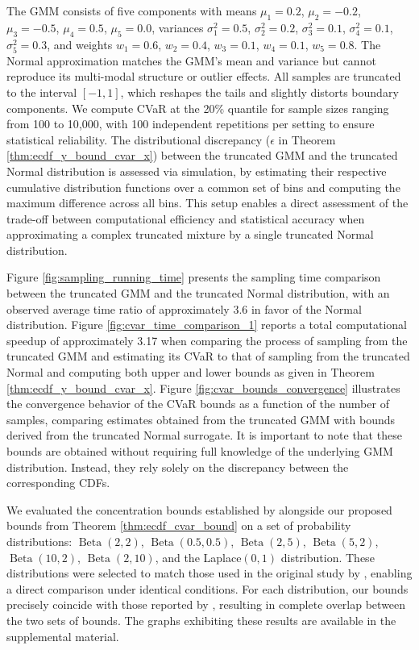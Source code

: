 \documentclass[letterpaper]{article} %
\begin{document}
The GMM consists of five components with means $\mu_1 = 0.2$, $\mu_2 = -0.2$, $\mu_3 = -0.5$, $\mu_4 = 0.5$, $\mu_5 = 0.0$, variances $\sigma_1^2 = 0.5$, $\sigma_2^2 = 0.2$, $\sigma_3^2 = 0.1$, $\sigma_4^2 = 0.1$, $\sigma_5^2 = 0.3$, and weights $w_1 = 0.6$, $w_2 = 0.4$, $w_3 = 0.1$, $w_4 = 0.1$, $w_5 = 0.8$. The Normal approximation matches the GMM's mean and variance but cannot reproduce its multi-modal structure or outlier effects. All samples are truncated to the interval $[-1, 1]$, which reshapes the tails and slightly distorts boundary components. We compute CVaR at the 20\% quantile for sample sizes ranging from 100 to 10{,}000, with 100 independent repetitions per setting to ensure statistical reliability. The distributional discrepancy ($\epsilon$ in Theorem \ref{thm:ecdf_y_bound_cvar_x}) between the truncated GMM and the truncated Normal distribution is assessed via simulation, by estimating their respective cumulative distribution functions over a common set of bins and computing the maximum difference across all bins. This setup enables a direct assessment of the trade-off between computational efficiency and statistical accuracy when approximating a complex truncated mixture by a single truncated Normal distribution.

Figure \ref{fig:sampling_running_time} presents the sampling time comparison between the truncated GMM and the truncated Normal distribution, with an observed average time ratio of approximately 3.6 in favor of the Normal distribution. Figure \ref{fig:cvar_time_comparison_1} reports a total computational speedup of approximately 3.17 when comparing the process of sampling from the truncated GMM and estimating its CVaR to that of sampling from the truncated Normal and computing both upper and lower bounds as given in Theorem \ref{thm:ecdf_y_bound_cvar_x}. Figure \ref{fig:cvar_bounds_convergence} illustrates the convergence behavior of the CVaR bounds as a function of the number of samples, comparing estimates obtained from the truncated GMM with bounds derived from the truncated Normal surrogate. It is important to note that these bounds are obtained without requiring full knowledge of the underlying GMM distribution. Instead, they rely solely on the discrepancy between the corresponding CDFs. 

We evaluated the concentration bounds established by \cite{pmlr-v97-thomas19a} alongside our proposed bounds from Theorem \ref{thm:ecdf_cvar_bound} on a set of probability distributions: $\operatorname{Beta}(2, 2)$, $\operatorname{Beta}(0.5, 0.5)$, $\operatorname{Beta}(2, 5)$, $\operatorname{Beta}(5, 2)$, $\operatorname{Beta}(10, 2)$, $\operatorname{Beta}(2, 10)$, and the Laplace$(0, 1)$ distribution. These distributions were selected to match those used in the original study by \cite{pmlr-v97-thomas19a}, enabling a direct comparison under identical conditions. For each distribution, our bounds precisely coincide with those reported by \cite{pmlr-v97-thomas19a}, resulting in complete overlap between the two sets of bounds. The graphs exhibiting these results are available in the supplemental material.
\end{document}
